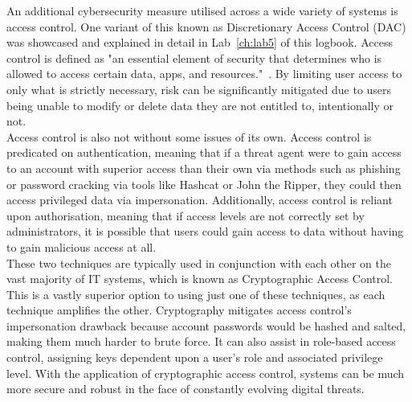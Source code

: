 \documentclass[12pt]{report}
\begin{document}
    \noindent An additional cybersecurity measure utilised across a wide variety of systems is access control.
    One variant of this known as Discretionary Access Control (DAC) was showcased and explained in detail
    in Lab~\ref{ch:lab5} of this logbook.
    Access control is defined as "an essential element of security that determines who is allowed to
    access certain data, apps, and resources."~\autocite{AccessControlMS}.
    By limiting user access to only what is strictly necessary, risk can be significantly mitigated due to
    users being unable to modify or delete data they are not entitled to, intentionally or not.\\

    \noindent Access control is also not without some issues of its own.
    Access control is predicated on authentication, meaning that if a threat agent were to gain access to an account
    with superior access than their own via methods such as phishing or password cracking via tools like Hashcat or
    John the Ripper, they could then access privileged data via impersonation.
    Additionally, access control is reliant upon authorisation, meaning that if access levels are not correctly
    set by administrators, it is possible that users could gain access to data without having to gain malicious
    access at all.\\

    \noindent These two techniques are typically used in conjunction with each other on the vast majority of
    IT systems, which is known as Cryptographic Access Control.
    This is a vastly superior option to using just one of these techniques, as each technique amplifies the other.
    Cryptography mitigates access control's impersonation drawback because account passwords
    would be hashed and salted, making them much harder to brute force.
    It can also assist in role-based access control, assigning keys dependent upon a user's role
    and associated privilege level.
    With the application of cryptographic access control, systems can be much more secure and robust
    in the face of constantly evolving digital threats.


    \printbibliography[title=Bibliography~~~~~~~~~~~~~~~~~~~~~~~\footnotesize{In order of appearance}]
\end{document}

